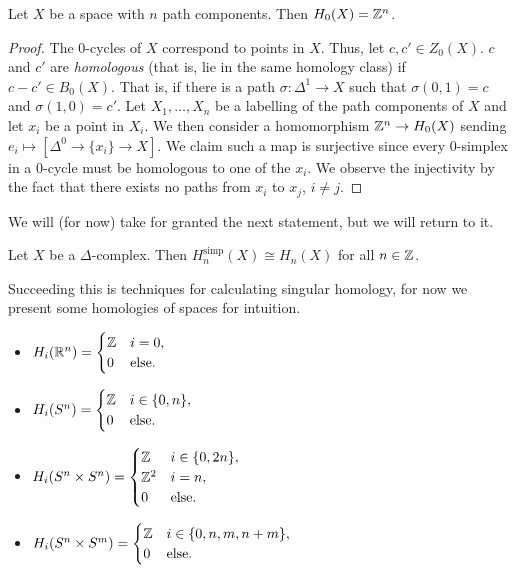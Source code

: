 \begin{proposition}
	Let $X$ be a space with $n$ path components. Then $H_0(X) = \mathbb{Z}^n$.
\end{proposition}

\begin{proof}
	The $0$-cycles of $X$ correspond to points in $X$. Thus, let $c, c' \in Z_0(X)$. $c$ and $c'$ are \emph{homologous} (that is, lie in the same homology class) if $c - c' \in B_0(X)$. That is, if there is a path $\sigma: \Delta^1 \to X$ such that $\sigma(0,1) = c$ and $\sigma(1,0) = c'$. Let $X_1, \ldots, X_n$ be a labelling of the path components of $X$ and let $x_i$ be a point in $X_i$. We then consider a homomorphism $\mathbb{Z}^n \to H_0(X)$ sending $e_i \mapsto [\Delta^0 \to \{x_i\} \to X]$. We claim such a map is surjective since every $0$-simplex in a $0$-cycle must be homologous to one of the $x_i$. We observe the injectivity by the fact that there exists no paths from $x_i$ to $x_j$, $i \neq j$.
\end{proof}

We will (for now) take for granted the next statement, but we will return to it.

\begin{theorem}
	Let $X$ be a $\Delta$-complex. Then $H_n^{\text{simp}}(X) \cong H_n(X)$ for all $n \in \mathbb{Z}$.
\end{theorem}

Succeeding this is techniques for calculating singular homology, for now we present some homologies of spaces for intuition.

\begin{example}
	\begin{itemize}
		\item
		      $
			      H_i(\mathbb{R}^n) =
			      \begin{cases}
				      \mathbb{Z} & i = 0,       \\
				      0  & \text{else}.
			      \end{cases}
		      $

		\item
		      $
			      H_i(S^n) =
			      \begin{cases}
				      \mathbb{Z} & i \in \{0, n\}, \\
				      0  & \text{else}.
			      \end{cases}
		      $

		\item
		      $
			      H_i(S^n \times S^n) =
			      \begin{cases}
				      \mathbb{Z}   & i \in \{0, 2n\}, \\
				      \mathbb{Z}^2 & i = n,           \\
				      0    & \text{else}.
			      \end{cases}
		      $

		\item
		      $
			      H_i(S^n \times S^m) =
			      \begin{cases}
				      \mathbb{Z} & i \in \{0, n, m, n+m\}, \\
				      0  & \text{else}.
			      \end{cases}
		      $
	\end{itemize}
\end{example}

